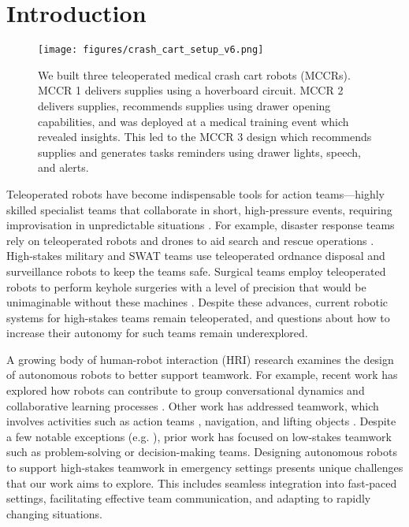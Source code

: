 

\section{Introduction}
 


\begin{figure}[t]
    \centering
 \texttt{[image: figures/crash\_cart\_setup\_v6.png]}
    \caption{We built three teleoperated medical crash cart robots (MCCRs). MCCR 1 delivers supplies using a hoverboard circuit. MCCR 2 delivers supplies, recommends supplies using drawer opening capabilities, and was deployed at a medical training event which revealed insights. This led to the MCCR 3 design which recommends supplies and generates tasks reminders using drawer lights, speech, and alerts.}
    \label{fig:cart_cart_field_studies}
    \vspace{-5pt}
\end{figure}



Teleoperated robots have become indispensable tools for action teams---highly skilled specialist teams that collaborate in short, high-pressure events, requiring improvisation in unpredictable situations \cite{sundstrom1990work}. 
For example, disaster response teams rely on teleoperated robots and drones to aid search and rescue operations \cite{casper2003human, murphy2017disaster}. 
High-stakes military and SWAT teams use teleoperated ordnance disposal \cite{carpenter2016culture} and surveillance robots \cite{jones2002autonomous} to keep the teams safe. 
Surgical teams employ teleoperated robots to perform keyhole surgeries with a level of precision that would be unimaginable without these machines \cite{cheatle2019sensing, beane2019shadow}. 
Despite these advances, current robotic systems for high-stakes teams remain teleoperated, and questions about how to increase their autonomy for such teams remain underexplored.


A growing body of human-robot interaction (HRI) research examines the design of autonomous robots to better support teamwork. 
For example, recent work has explored how robots can contribute to group conversational dynamics and collaborative learning processes \cite{tennent2019micbot,alves2019empathic}. 
Other work has addressed teamwork, which involves activities such as action teams \cite{jamshad2024taking}, navigation, and lifting objects \cite{fourie2022joint}. 
Despite a few notable exceptions (e.g. \cite{jamshad2024taking,bethel2012discoveries, jones2002extreme}), prior work has focused on low-stakes teamwork such as problem-solving or decision-making teams. 
Designing autonomous robots to support high-stakes teamwork in emergency settings presents unique challenges that our work aims to explore. 
This includes seamless integration into fast-paced settings, facilitating effective team communication, and adapting to rapidly changing situations.

